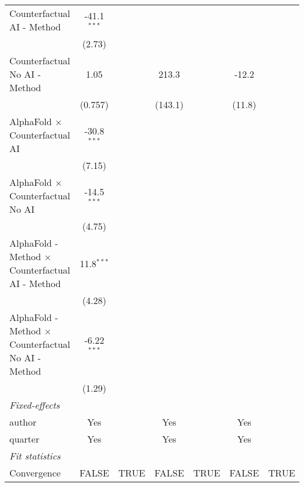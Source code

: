 \begin{tabular}{lcccccc}
   Counterfactual AI - Method                                 & -41.1$^{***}$ &      &              &      &              &   \\   
                                                              & (2.73)        &      &              &      &              &   \\   
   Counterfactual No AI - Method                              & 1.05          &      & 213.3        &      & -12.2        &   \\   
                                                              & (0.757)       &      & (143.1)      &      & (11.8)       &   \\   
   AlphaFold $\times$ Counterfactual AI                       & -30.8$^{***}$ &      &              &      &              &   \\   
                                                              & (7.15)        &      &              &      &              &   \\   
   AlphaFold $\times$ Counterfactual No AI                    & -14.5$^{***}$ &      &              &      &              &   \\   
                                                              & (4.75)        &      &              &      &              &   \\   
   AlphaFold - Method $\times$ Counterfactual AI - Method     & 11.8$^{***}$  &      &              &      &              &   \\   
                                                              & (4.28)        &      &              &      &              &   \\   
   AlphaFold - Method $\times$ Counterfactual No AI - Method  & -6.22$^{***}$ &      &              &      &              &   \\   
                                                              & (1.29)        &      &              &      &              &   \\   
   \midrule
   \emph{Fixed-effects}\\
   author                                                     & Yes           &      & Yes          &      & Yes          & \\  
   quarter                                                    & Yes           &      & Yes          &      & Yes          & \\  
   \midrule
   \emph{Fit statistics}\\
   Convergence                                                &FALSE          & TRUE & FALSE        & TRUE & FALSE        & TRUE\\  

\end{tabular}
